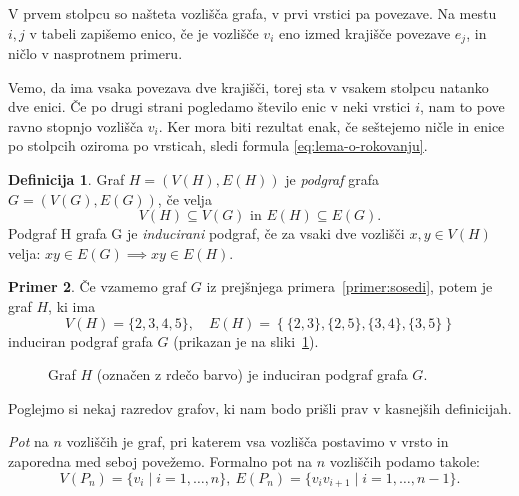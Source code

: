 \documentclass[12pt,a4paper]{amsart}
\theoremstyle{definition} %
\newtheorem{definicija}{Definicija}[section]
\newtheorem{primer}[definicija]{Primer}
\theoremstyle{plain} %
\newcommand{\graf}[1][G]{\ensuremath{#1 = (V(#1), E(#1))}}
\newcommand{\vozlisca}[1][G]{\ensuremath{V(#1)}}
\newcommand{\povezave}[1][G]{\ensuremath{E(#1)}}
\begin{document}
    V prvem stolpcu so našteta vozlišča grafa, v prvi vrstici pa povezave. Na mestu $i,j$ v tabeli zapišemo enico, če je vozlišče $v_i$ eno izmed krajišče povezave $e_j$, in ničlo v nasprotnem primeru. 
    
    Vemo, da ima vsaka povezava dve krajišči, torej sta v vsakem stolpcu natanko dve enici. Če po drugi strani pogledamo število enic v neki vrstici $i$, nam to pove ravno stopnjo vozlišča $v_i$. Ker mora biti rezultat enak, če seštejemo ničle in enice po stolpcih oziroma po vrsticah, sledi formula \eqref{eq:lema-o-rokovanju}.
\endproof

\begin{definicija}
	Graf $\graf[H]$ je \emph{podgraf} grafa $\graf$, če velja 
	\[ \vozlisca[H] \subseteq \vozlisca \text{ in } \povezave[H] \subseteq \povezave. \]
	Podgraf H grafa G je \emph{inducirani} podgraf, če za vsaki dve vozlišči $x,y\in \vozlisca[H]$ velja: $xy \in \povezave \implies xy \in \povezave[H]$.
\end{definicija}

\begin{primer}
    Če vzamemo graf $G$ iz prejšnjega primera~\ref{primer:sosedi}, potem je graf $H$, ki ima
    \[ \vozlisca[H] = \{2,3,4,5\},\quad \povezave[H] = \left\{ \{2,3\},\{2,5\},\{3,4\},\{3,5\} \right\} \]
    induciran podgraf grafa $G$ (prikazan je na sliki~\ref{fig:primer-podgrafa}).
\end{primer}
\medskip

\begin{figure}[h]
    \caption{Graf $H$ (označen z rdečo barvo) je induciran podgraf grafa $G$.}
    \label{fig:primer-podgrafa}
\end{figure}

Poglejmo si nekaj razredov grafov, ki nam bodo prišli prav v kasnejših definicijah. 

\emph{Pot} na $n$ vozliščih je graf, pri katerem vsa vozlišča postavimo v vrsto in zaporedna med seboj povežemo. Formalno pot na $n$ vozliščih podamo takole:
\[ V(P_n) = \{v_i \mid i=1,\dots,n\},\ E(P_n)=\{v_iv_{i+1} \mid  i=1,\dots,n-1 \} .\]
\end{document}
